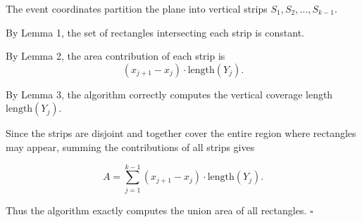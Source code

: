 \documentclass{article}
\begin{document}
The event coordinates partition the plane into vertical strips $S_1, S_2, \dots, S_{k-1}$.

By Lemma 1, the set of rectangles intersecting each strip is constant.

By Lemma 2, the area contribution of each strip is
\[
(x_{j+1}-x_j)\cdot \text{length}(Y_j).
\]

By Lemma 3, the algorithm correctly computes the vertical coverage length $\text{length}(Y_j)$.

Since the strips are disjoint and together cover the entire region where rectangles may appear, summing the contributions of all strips gives

\[
A = \sum_{j=1}^{k-1} (x_{j+1}-x_j)\cdot \text{length}(Y_j).
\]

Thus the algorithm exactly computes the union area of all rectangles.  
\hfill $\square$
\end{document}
